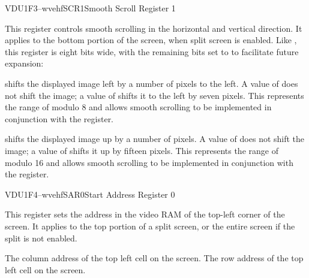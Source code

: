 \begin{ioport}{VDU}{1F3}{--wvehf}{SCR1}{Smooth Scroll Register 1}

  This register controls smooth scrolling in the horizontal and vertical
  direction. It applies to the bottom portion of the screen, when split screen
  is enabled. Like , this register is eight bits wide, with the
  remaining bits set to  to facilitate future expansion:

  \begin{bitfield}
  \end{bitfield}

  \begin{description}
     shifts the displayed image left by a number of
    pixels to the left. A value of  does not shift the image; a value of
     shifts it to the left by seven pixels. This represents the range of
    modulo 8 and allows smooth scrolling to be implemented in conjunction with
    the  register.

     shifts the displayed image up by a number of pixels. A
    value of  does not shift the image; a value of  shifts it up
    by fifteen pixels. This represents the range of modulo 16 and allows smooth
    scrolling to be implemented in conjunction with the  register.
  \end{description}

\end{ioport}





\begin{ioport}{VDU}{1F4}{--wvehf}{SAR0}{Start Address Register 0}

  This register sets the address in the video RAM of the top-left corner of the
  screen. It applies to the top portion of a split screen, or the entire screen
  if the split is not enabled.

  \begin{bitfield}
  \end{bitfield}

  \begin{description}
   The column address of the top left cell on the screen.
   The row address of the top left cell on the screen.
  \end{description}

\end{ioport}






